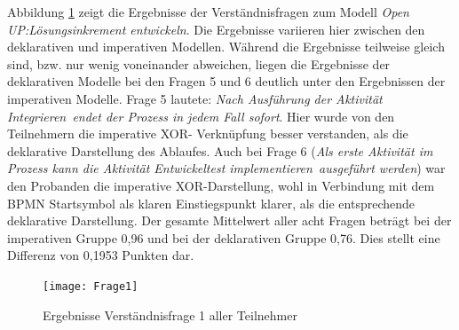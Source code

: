Abbildung \ref{fig:Frage1} zeigt die Ergebnisse der Verständnisfragen zum Modell \textit{Open UP:Lösungsinkrement entwickeln}. Die Ergebnisse variieren hier zwischen den deklarativen und imperativen Modellen. Während die Ergebnisse teilweise gleich sind, bzw. nur wenig voneinander abweichen, liegen die Ergebnisse der deklarativen Modelle bei den Fragen 5 und 6 deutlich unter den Ergebnissen der imperativen Modelle. \newline
Frage 5 lautete: \textit{Nach Ausführung der Aktivität \grqq Integrieren\grqq \ endet der Prozess in jedem Fall sofort}. Hier wurde von den Teilnehmern die imperative XOR- Verknüpfung besser verstanden, als die deklarative Darstellung des Ablaufes. Auch bei Frage 6 (\textit{Als erste Aktivität im Prozess kann die Aktivität \grqq Entwickeltest implementieren\grqq \ ausgeführt werden}) war den Probanden die imperative XOR-Darstellung, wohl in Verbindung mit dem BPMN Startsymbol als klaren Einstiegspunkt klarer, als die entsprechende deklarative Darstellung.\newline
Der gesamte Mittelwert aller acht Fragen beträgt bei der imperativen Gruppe 0,96 und bei der deklarativen Gruppe 0,76. Dies stellt eine Differenz von 0,1953 Punkten dar. \newline

\begin{figure}[htp]
\begin{center}
  \texttt{[image: Frage1]} %
  \caption{Ergebnisse Verständnisfrage 1 aller Teilnehmer}
  \label{fig:Frage1}
\end{center}
\end{figure}


